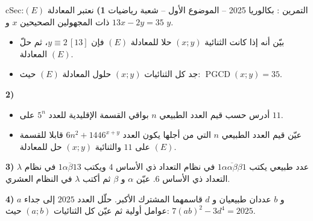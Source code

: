 \documentclass[12pt,a4paper]{article}
\newenvironment{BOX}[2]{\begin{otherlanguage}{english}\begin{arbox}{#1}{#2}}{\end{arbox}\end{otherlanguage}}
\newcounter{exo}
\newenvironment{tamrin}[1]{\stepcounter{exo}\begin{BOX}{cSec}{التمرين \theexo: #1}}{\end{BOX}}
\newcommand{\pgcd}{\operatorname{PGCD}}
\newenvironment{sq}{\begin{itemize}[leftmargin=2.4em,itemsep=3pt]}{\end{itemize}}
\newcommand{\qa}{\item[(أ)]}\newcommand{\qb}{\item[(ب)]}\newcommand{\qc}{\item[(جـ)]}\newcommand{\qd}{\item[(د)]}\newcommand{\qe}{\item[(هـ)]}
\begin{document}
\begin{tamrin}{بكالوريا 2025 -- الموضوع الأول -- شعبة رياضيات}
\textbf{1)} نعتبر المعادلة $(E)$:\quad $13x-2y=35$ ذات المجهولين الصحيحين $x$ و $y$.
\begin{sq}
\qa بيّن أنه إذا كانت الثنائية $(x;y)$ حلا للمعادلة $(E)$ فإن $y\equiv2\,[13]$، ثم حلّ المعادلة $(E)$.
\qb جد كل الثنائيات $(x;y)$ حلول المعادلة $(E)$ حيث: $\pgcd(x;y)=35$.
\end{sq}
\textbf{2)}
\begin{sq}
\qa أدرس حسب قيم العدد الطبيعي $n$ بواقي القسمة الإقليدية للعدد $5^n$ على $11$.
\qb عيّن قيم العدد الطبيعي $n$ التي من أجلها يكون العدد $6n^2+1446^{x+y}$ قابلا للقسمة على $11$ والثنائية $(x;y)$ حل للمعادلة $(E)$.
\end{sq}
\textbf{3)} $\lambda$ عدد طبيعي يكتب $\overline{1\alpha\alpha\beta\beta1}$ في نظام التعداد ذي الأساس $4$ ويكتب $\overline{1\alpha\beta13}$ في نظام التعداد ذي الأساس $6$.
عيّن $\alpha$ و $\beta$ ثم أكتب $\lambda$ في النظام العشري.

\textbf{4)} $a$ و $b$ عددان طبيعيان و $d$ قاسمهما المشترك الأكبر.
حلّل العدد $2025$ إلى جداء عوامل أولية ثم عيّن كل الثنائيات $(a;b)$ حيث: $7(ab)^2-3d^4=2025$.
\end{tamrin}
\end{document}
